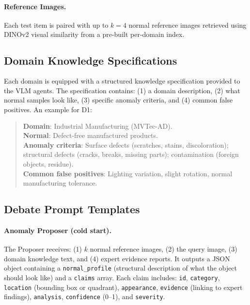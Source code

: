 \paragraph{Reference Images.}
Each test item is paired with up to $k{=}4$ normal reference images retrieved using DINOv2 visual similarity from a pre-built per-domain index.

\subsection{Domain Knowledge Specifications}
\label{app:domain_knowledge}

Each domain is equipped with a structured knowledge specification provided to the VLM agents. The specification contains: (1) a domain description, (2) what normal samples look like, (3) specific anomaly criteria, and (4) common false positives. An example for D1:

\begin{quote}
\small
\textbf{Domain}: Industrial Manufacturing (MVTec-AD). \\
\textbf{Normal}: Defect-free manufactured products. \\
\textbf{Anomaly criteria}: Surface defects (scratches, stains, discoloration); structural defects (cracks, breaks, missing parts); contamination (foreign objects, residue). \\
\textbf{Common false positives}: Lighting variation, slight rotation, normal manufacturing tolerance.
\end{quote}

\subsection{Debate Prompt Templates}
\label{app:prompts}

\paragraph{Anomaly Proposer (cold start).}
The Proposer receives: (1) $k$ normal reference images, (2) the query image, (3) domain knowledge text, and (4) expert evidence reports. It outputs a JSON object containing a \texttt{normal\_profile} (structural description of what the object should look like) and a \texttt{claims} array. Each claim includes: \texttt{id}, \texttt{category}, \texttt{location} (bounding box or quadrant), \texttt{appearance}, \texttt{evidence} (linking to expert findings), \texttt{analysis}, \texttt{confidence} (0--1), and \texttt{severity}.

